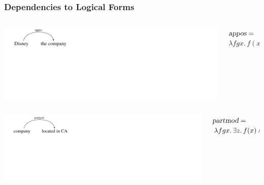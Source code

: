 \documentclass[mathserif,12pt]{beamer}
\renewcommand{\land}{\wedge}
\newcommand{\lspace}{.\,}
\begin{document}
\begin{frame}
\frametitle{Dependencies to Logical Forms}
 \vspace{0.6cm}
\begin{columns}
  \begin{column}{0.40\textwidth}
   \centering
  \vspace{-1em}
\includegraphics[trim=2em 9em 28em 0em,clip=true,scale=1.3]{figures/appos}   
  \end{column}
  \begin{column}{0.58\textwidth}
    \large $\textsl{appos}  =$ \\ \hspace{0.5em} $ \lambda f g x \lspace f(x) \land g(x)$ \\
  \end{column}
 \end{columns}
 
 \vspace{0.6cm}
 \begin{columns}
  \begin{column}{0.39\textwidth}
   \centering
\includegraphics[trim=1.9em 9em 26em 0em,clip=true,scale=1.2]{figures/partmod}
  \end{column}
  \begin{column}{0.60\textwidth}
\large    $\textsl{partmod}= $ \\ \hspace{0.5em} $\lambda f g x \lspace \exists z \lspace f(x) \land g(z) \land \hbox{arg}_2(z_e, x_a)$ 
  \end{column}
 \end{columns}
 

\end{frame}
\end{document}
